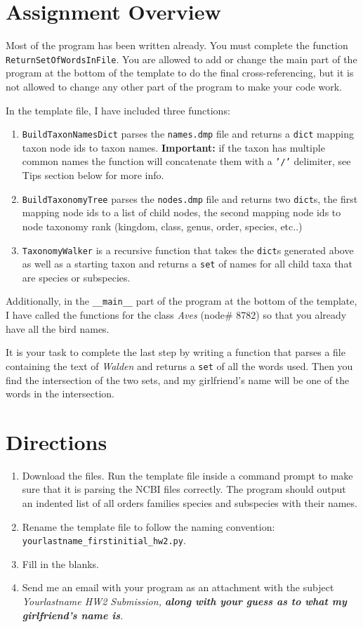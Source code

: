 \documentclass[11pt]{amsart}
\begin{document}
\section*{Assignment Overview}
Most of the program has been written already. You must complete the function \\ \texttt{ReturnSetOfWordsInFile}. You are allowed to add or change the main part of the program at the bottom of the template to do the final cross-referencing, but it is not allowed to change any other part of the program to make your code work.

In the template file, I have included three functions:
\begin{enumerate}
	\item \texttt{BuildTaxonNamesDict} parses the \texttt{names.dmp} file and returns a \texttt{dict} mapping taxon node ids to taxon names. \textbf{Important:} if the taxon has multiple common names the function will concatenate them with a \texttt{'/'} delimiter, see Tips section below for more info.
	\item \texttt{BuildTaxonomyTree} parses the \texttt{nodes.dmp} file and returns two \texttt{dict}s, the first mapping node ids to a list of child nodes, the second mapping node ids to node taxonomy rank (kingdom, class, genus, order, species, etc..)
	\item \texttt{TaxonomyWalker} is a recursive function that takes the \texttt{dict}s generated above as well as a starting taxon and returns a \texttt{set} of names for all child taxa that are species or subspecies.
\end{enumerate}
Additionally, in the \texttt{__main__} part of the program at the bottom of the template, I have called the functions for the class \textit{Aves} (node\# 8782) so that you already have all the bird names.

It is your task to complete the last step by writing a function that parses a file containing the text of \textit{Walden} and returns a \texttt{set} of all the words used. Then you find the intersection of the two sets, and my girlfriend's name will be one of the words in the intersection.

\section*{Directions}
\begin{enumerate}
	\item Download the files. Run the template file inside a command prompt to make sure that it is parsing the NCBI files correctly. The program should output an indented list of all orders families species and subspecies with their names.
	\item Rename the template file to follow the naming convention: \\ \texttt{yourlastname_firstinitial_hw2.py}.
	\item Fill in the blanks.
	\item Send me an email with your program as an attachment with the subject \em{Yourlastname HW2 Submission}, \textbf{along with your guess as to what my girlfriend's name is}.
\end{enumerate}
\end{document}
